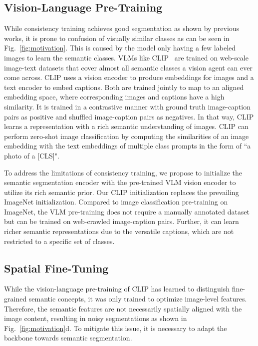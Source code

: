 \documentclass[10pt,twocolumn,letterpaper]{article}
\begin{document}
\subsection{Vision-Language Pre-Training}
\label{sec:methods_vl_pretraining}
While consistency training achieves good segmentation as shown by previous works, 
it is prone to confusion of visually similar classes as can be seen in Fig.~\ref{fig:motivation}.
This is caused by the model only having a few labeled images to learn the semantic classes. 
VLMs like CLIP~\cite{radford2021learning} are trained on web-scale image-text datasets that cover almost all semantic classes a vision agent can ever come across. CLIP uses a vision encoder  to produce embeddings for images and a text encoder  to embed captions.
Both are trained jointly to map to an aligned embedding space, where corresponding images and captions have a high similarity. It is trained in a contrastive manner with ground truth image-caption pairs as positive and shuffled image-caption pairs as negatives. In that way, CLIP learns a representation with a rich semantic understanding of images.
CLIP can perform zero-shot image classification by computing the similarities of an image embedding  with the text embeddings  of multiple class prompts  in the form of ``a photo of a [CLS]". 

To address the limitations of consistency training, we propose to initialize the semantic segmentation encoder  with the pre-trained VLM vision encoder  to utilize its rich semantic prior.
Our CLIP initialization replaces the prevailing ImageNet initialization. Compared to image classification pre-training on ImageNet, the VLM pre-training does not require a manually annotated dataset but can be trained on web-crawled image-caption pairs. Further, it can learn richer semantic representations due to the versatile captions, which are not restricted to a specific set of classes.


\subsection{Spatial Fine-Tuning}
\label{sec:methods_spatial_finetuning}

While the vision-language pre-training of CLIP has learned to distinguish fine-grained semantic concepts, it was only trained to optimize image-level features. Therefore, the semantic features are not necessarily spatially aligned with the image content, resulting in noisy segmentations as shown in Fig.~\ref{fig:motivation}d. To mitigate this issue, it is necessary to adapt the backbone towards semantic segmentation.
\end{document}
